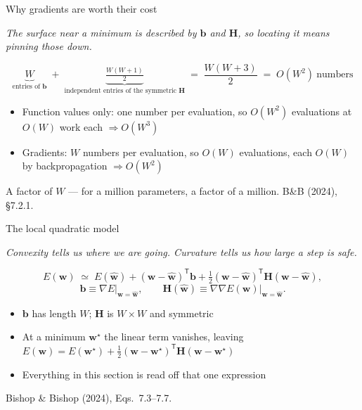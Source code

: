 \documentclass[aspectratio=169, 11pt]{beamer}
\newcommand{\bridge}[1]{%
  {\scriptsize\itshape\color{mcMuted} #1\par}\vspace{0.35em}}
\newcommand{\srcline}[1]{%
  \par\vspace{0.25em}%
  {\scriptsize\color{mcMuted}\hfill #1\par}}
\newcommand{\figsource}[1]{{\scriptsize\color{mcMuted} #1}}
\newcommand{\src}[3]{}      %
\begin{document}
\begin{frame}{Why gradients are worth their cost}
  \src{bishop2024}{section}{7.2.1}
  \bridge{The surface near a minimum is described by $\mathbf{b}$ and $\mathbf{H}$, so
  locating it means pinning those down.}
  \vspace{-0.55em}
  \[
    \underbrace{W}_{\text{entries of } \mathbf{b}}
    \;+\;
    \underbrace{\tfrac{W(W+1)}{2}}_{\text{independent entries of the symmetric } \mathbf{H}}
    \;=\; \frac{W(W+3)}{2} \;=\; O(W^2) \ \text{numbers}
  \]
  \vspace{-0.85em}
  \begin{itemize}\itemsep0.3em
    \item \alert{Function values only}: one number per evaluation, so
          $O(W^2)$ evaluations at $O(W)$ work each
          $\Rightarrow O(W^3)$
    \item \alert{Gradients}: $W$ numbers per evaluation, so $O(W)$
          evaluations, each $O(W)$ by backpropagation
          $\Rightarrow O(W^2)$
  \end{itemize}
  \begin{redhighlight}
    A factor of $W$ --- for a million parameters, a factor of a million.
    \figsource{B\&B (2024), \S7.2.1.}
  \end{redhighlight}
\end{frame}

\begin{frame}{The local quadratic model}
  \src{bishop2024}{equation}{7.3-7.7}
  \src{bishop2024}{section}{7.1.1}
  \bridge{Convexity tells us where we are going. Curvature tells us how
  large a step is safe.}
  \vspace{-0.35em}
  \[
    E(\mathbf{w}) \;\simeq\; E(\hat{\mathbf{w}}) + (\mathbf{w} - \hat{\mathbf{w}})^{\mathsf T} \mathbf{b}
          + \tfrac12 (\mathbf{w} - \hat{\mathbf{w}})^{\mathsf T} \mathbf{H} (\mathbf{w} - \hat{\mathbf{w}}),
  \]
  \vspace{-1.0em}
  \[
    \mathbf{b} \equiv \nabla E \big|_{\mathbf{w} = \hat{\mathbf{w}}},
    \qquad
    \mathbf{H}(\hat{\mathbf{w}}) \equiv \nabla\nabla E(\mathbf{w}) \big|_{\mathbf{w} = \hat{\mathbf{w}}} .
  \]
  \vspace{-0.5em}
  \begin{itemize}\itemsep0.35em
    \item $\mathbf{b}$ has length $W$; $\mathbf{H}$ is $W \times W$ and symmetric
    \item At a minimum $\mathbf{w}^\star$ the linear term vanishes, leaving
          $E(\mathbf{w}) = E(\mathbf{w}^\star)
           + \tfrac12 (\mathbf{w}-\mathbf{w}^\star)^{\mathsf T} \mathbf{H} (\mathbf{w}-\mathbf{w}^\star)$
    \item Everything in this section is read off that one expression
  \end{itemize}
  \srcline{Bishop \& Bishop (2024), Eqs.~7.3--7.7.}
\end{frame}
\end{document}
